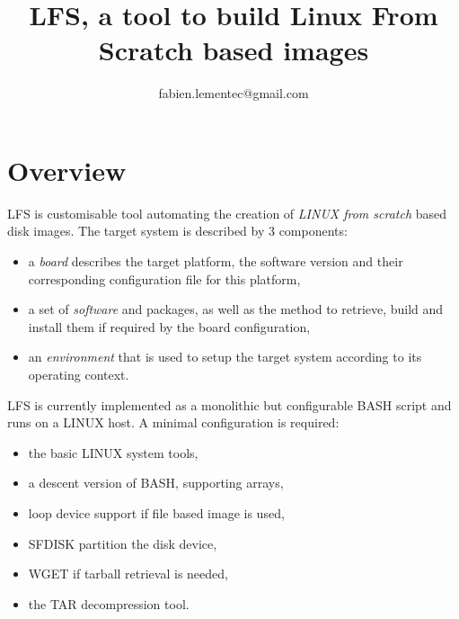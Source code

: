 \documentclass[a4paper, 11pt]{article}
\begin{document}
\title{LFS, a tool to build Linux From Scratch based images}
\author{fabien.lementec@gmail.com}
\date{}

\maketitle

\newpage
\tableofcontents
{}


\newpage
\section{Overview}
LFS is customisable tool automating the creation of \textit{LINUX from scratch}
based disk images. The target system is described by 3 components:
\begin{itemize}
\item a \textit{board} describes the target platform, the software version and
their corresponding configuration file for this platform,
\item a set of \textit{software} and packages, as well as the method to retrieve,
build and install them if required by the board configuration,
\item an \textit{environment} that is used to setup the target system according
to its operating context.
\end{itemize}
LFS is currently implemented as a monolithic but configurable BASH script and
runs on a LINUX host. A minimal configuration is required:
\begin{itemize}
\item the basic LINUX system tools,
\item a descent version of BASH, supporting arrays,
\item loop device support if file based image is used,
\item SFDISK partition the disk device,
\item WGET if tarball retrieval is needed,
\item the TAR decompression tool.
\end{itemize}


\clearpage
\end{document}
